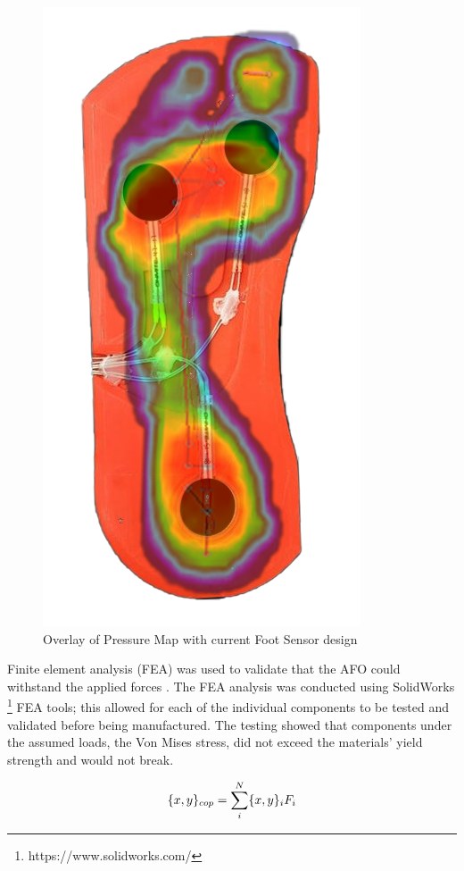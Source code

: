 \begin{figure}[h!]
    \centering
    \includegraphics[scale=0.25, angle =-90 , frame]{images/mech_design/sole.png}
    \caption[Pressure Map of Foot]{Overlay of Pressure Map with current Foot Sensor design}
    \label{fig:Foot-Force Mapping}
\end{figure}

Finite element analysis (FEA) was used to validate that the AFO could withstand the applied forces \cite{akin2010finite}. The FEA analysis was conducted using SolidWorks \footnote{https://www.solidworks.com/} FEA tools; this allowed for each of the individual components to be tested and validated before being manufactured. The testing showed that components under the assumed loads, the Von Mises \cite{shigley} stress, did not exceed the materials' yield strength and would not break.

\begin{equation}
\large
    \{x,y\}_{cop} = \sum_{i}^{N} \{x,y\}_i F_i
    \label{eq:FSRCoP}
\end{equation}

